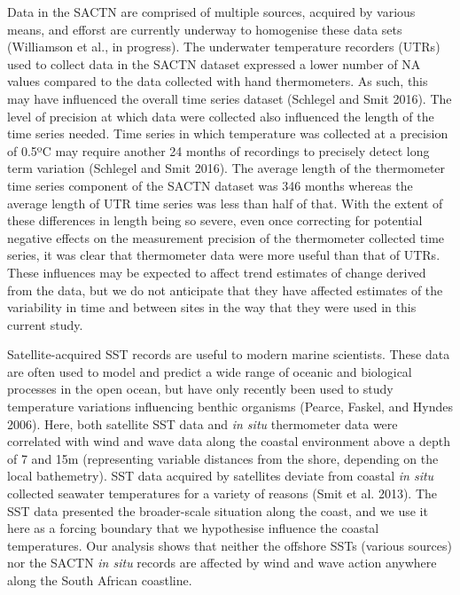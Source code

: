 \documentclass[10pt,a4paper,]{article}
\begin{document}
Data in the SACTN are comprised of multiple sources, acquired by various
means, and efforst are currently underway to homogenise these data sets
(Williamson et al., in progress). The underwater temperature recorders
(UTRs) used to collect data in the SACTN dataset expressed a lower
number of NA values compared to the data collected with hand
thermometers. As such, this may have influenced the overall time series
dataset (Schlegel and Smit 2016). The level of precision at which data
were collected also influenced the length of the time series needed.
Time series in which temperature was collected at a precision of 0.5ºC
may require another 24 months of recordings to precisely detect long
term variation (Schlegel and Smit 2016). The average length of the
thermometer time series component of the SACTN dataset was 346 months
whereas the average length of UTR time series was less than half of
that. With the extent of these differences in length being so severe,
even once correcting for potential negative effects on the measurement
precision of the thermometer collected time series, it was clear that
thermometer data were more useful than that of UTRs. These influences
may be expected to affect trend estimates of change derived from the
data, but we do not anticipate that they have affected estimates of the
variability in time and between sites in the way that they were used in
this current study.

Satellite-acquired SST records are useful to modern marine scientists.
These data are often used to model and predict a wide range of oceanic
and biological processes in the open ocean, but have only recently been
used to study temperature variations influencing benthic organisms
(Pearce, Faskel, and Hyndes 2006). Here, both satellite SST data and
\emph{in situ} thermometer data were correlated with wind and wave data
along the coastal environment above a depth of 7 and 15m (representing
variable distances from the shore, depending on the local bathemetry).
SST data acquired by satellites deviate from coastal \emph{in situ}
collected seawater temperatures for a variety of reasons (Smit et al.
2013). The SST data presented the broader-scale situation along the
coast, and we use it here as a forcing boundary that we hypothesise
influence the coastal temperatures. Our analysis shows that neither the
offshore SSTs (various sources) nor the SACTN \emph{in situ} records are
affected by wind and wave action anywhere along the South African
coastline.
\end{document}
